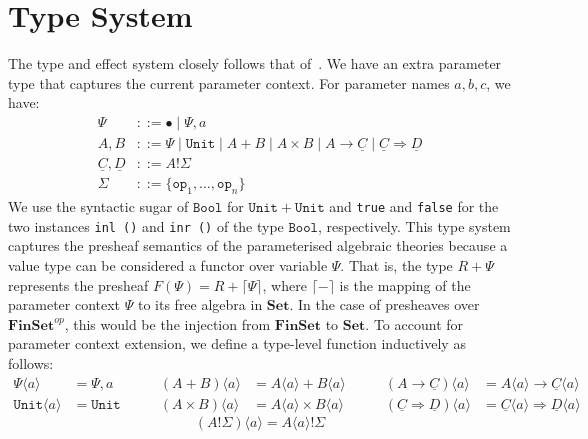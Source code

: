 \documentclass{scrartcl}
\theoremstyle{definition}
\newcommand{\Set}{\mathbf{Set}}
\newcommand{\Fin}{\mathbf{FinSet}}
\newcommand{\op}{\mathtt{op}}
\newcommand{\Unit}{\mathtt{Unit}}
\newcommand{\Bool}{\mathtt{Bool}}
\newcommand{\PCtx}{\Psi}
\newcommand{\cC}{\underline{C}}
\newcommand{\cD}{\underline{D}}
\begin{document}

\section{Type System}

The type and effect system closely follows that of~\cite{pretnar_introduction_2015}. We have an extra parameter type that captures the current parameter context. For parameter names $a,b,c$, we have:
\begin{align*}
    \PCtx &::= \bullet \mid \PCtx,a \\
    A, B &::= \PCtx \mid \Unit \mid A + B \mid A \times B \mid A \to \cC \mid \cC \Rightarrow \cD \\
    \cC, \cD &::= A!\Sigma \\
    \Sigma &::= \{\op_1,\dots,\op_n\}
\end{align*}
We use the syntactic sugar of $\Bool$ for $\Unit + \Unit$ and \lstinline{true} and \lstinline{false} for the two instances \lstinline{inl ()} and \lstinline{inr ()} of the type $\Bool$, respectively. This type system captures the presheaf semantics of the parameterised algebraic theories because a value type can be considered a functor over variable $\PCtx$. That is, the type $R + \PCtx$ represents the presheaf $F(\PCtx) = R + \lceil \PCtx\rceil$, where $\lceil{-}\rceil$ is the mapping of the parameter context $\PCtx$ to its free algebra in $\Set$. In the case of presheaves over $\Fin^{op}$, this would be the injection from $\Fin$ to $\Set$. To account for parameter context extension, we define a type-level function inductively as follows:
\begin{equation*}
    \begin{split}
        \PCtx\langle a \rangle &= \PCtx,a \\
        \Unit\langle a \rangle &= \Unit 
    \end{split}
    \qquad
    \begin{split}
        (A+B)\langle a \rangle &= A\langle a \rangle + B\langle a \rangle \\
        (A\times B)\langle a \rangle &= A\langle a \rangle \times B\langle a \rangle
    \end{split}
    \qquad
    \begin{split}
        (A\to \cC)\langle a \rangle &= A\langle a \rangle \to \cC\langle a \rangle \\
        (\cC \Rightarrow \cD)\langle a \rangle &= \cC\langle a \rangle \Rightarrow \cD\langle a \rangle
    \end{split}
\end{equation*}
\begin{equation*}
    (A!\Sigma) \langle a \rangle = A\langle a \rangle!\Sigma
\end{equation*}
\end{document}
